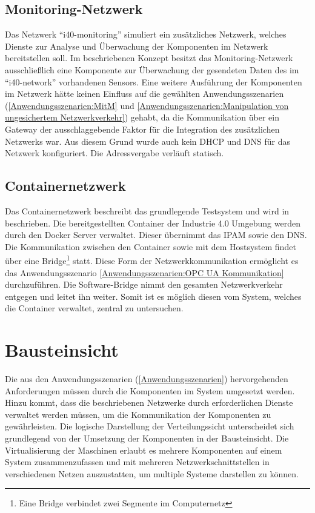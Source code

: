 \subsection{Monitoring-Netzwerk}
Das Netzwerk "`i40-monitoring"' simuliert ein zusätzliches Netzwerk, welches Dienste zur Analyse und Überwachung der Komponenten im Netzwerk bereitstellen soll. Im beschriebenen Konzept besitzt das Monitoring-Netzwerk ausschließlich eine Komponente zur Überwachung der gesendeten Daten des im "`i40-network"' vorhandenen Sensors. Eine weitere Ausführung der Komponenten im Netzwerk hätte keinen Einfluss auf die gewählten Anwendungsszenarien (\autoref{Anwendungsszenarien:MitM} und \autoref{Anwendungsszenarien:Manipulation von ungesichertem Netzwerkverkehr}) gehabt, da die Kommunikation über ein Gateway der ausschlaggebende Faktor für die Integration des zusätzlichen Netzwerks war. Aus diesem Grund wurde auch kein \ac{DHCP} und \ac{DNS} für das Netzwerk konfiguriert. Die Adressvergabe verläuft statisch.

\subsection{Containernetzwerk}
Das Containernetzwerk beschreibt das grundlegende Testsystem und wird in \cite{Weber2018} beschrieben. Die bereitgestellten Container der Industrie 4.0 Umgebung werden durch den Docker Server verwaltet. Dieser übernimmt das \ac{IPAM} sowie den \ac{DNS}. Die Kommunikation zwischen den Container sowie mit dem Hostsystem findet über eine Bridge\footnote{Eine Bridge verbindet zwei Segmente im Computernetz} statt. Diese Form der Netzwerkkommunikation ermöglicht es das Anwendungsszenario \autoref{Anwendungsszenarien:OPC UA Kommunikation} durchzuführen. Die Software-Bridge nimmt den gesamten Netzwerkverkehr entgegen und leitet ihn weiter. Somit ist es möglich diesen vom System, welches die Container verwaltet, zentral zu untersuchen.

\section{Bausteinsicht}
Die aus den Anwendungsszenarien (\autoref{Anwendungsszenarien}) hervorgehenden Anforderungen müssen durch die Komponenten im System umgesetzt werden. Hinzu kommt, dass die beschriebenen Netzwerke durch erforderlichen Dienste verwaltet werden müssen, um die Kommunikation der Komponenten zu gewährleisten. Die logische Darstellung der Verteilungssicht unterscheidet sich grundlegend von der Umsetzung der Komponenten in der Bausteinsicht. Die Virtualisierung der Maschinen erlaubt es mehrere Komponenten auf einem System zusammenzufassen und mit mehreren Netzwerkschnittstellen in verschiedenen Netzen auszustatten, um multiple Systeme darstellen zu können.

